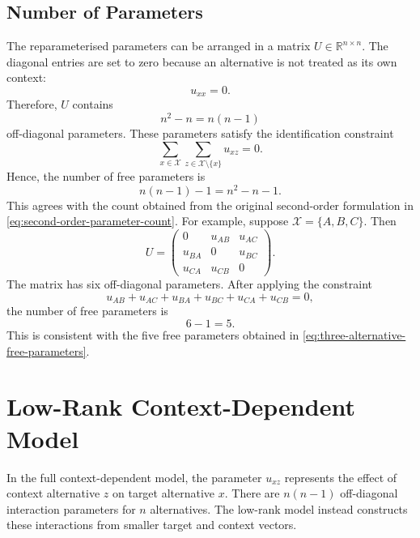 \documentclass[12pt,oneside]{report}
\newcommand{\R}{\mathbb{R}}
\newcommand{\X}{\mathcal{X}}
\begin{document}
\subsection{Number of Parameters}
The reparameterised parameters can be arranged in a matrix
$U\in\R^{n\times n}$. The diagonal entries are set to zero because an
alternative is not treated as its own context:
\begin{equation}
    u_{xx}=0.
\end{equation}
Therefore, $U$ contains
\begin{equation}
    n^2-n=n(n-1)
\end{equation}
off-diagonal parameters. These parameters satisfy the identification
constraint
\begin{equation}
    \sum_{x\in\X}
    \sum_{z\in\X\setminus\{x\}}u_{xz}=0.
    \label{eq:cdm-identification-constraint}
\end{equation}
Hence, the number of free parameters is
\begin{equation}
    n(n-1)-1=n^2-n-1.
\end{equation}
This agrees with the count obtained from the original second-order
formulation in \cref{eq:second-order-parameter-count}.
For example, suppose $\X=\{A,B,C\}$. Then
\begin{equation}
    U=
    \begin{pmatrix}
        0      & u_{AB} & u_{AC}\\
        u_{BA} & 0      & u_{BC}\\
        u_{CA} & u_{CB} & 0
    \end{pmatrix}.
\end{equation}
The matrix has six off-diagonal parameters. After applying the constraint
\begin{equation}
    u_{AB}+u_{AC}+u_{BA}+u_{BC}+u_{CA}+u_{CB}=0,
\end{equation}
the number of free parameters is
\begin{equation}
    6-1=5.
\end{equation}
This is consistent with the five free parameters obtained in
\cref{eq:three-alternative-free-parameters}.


\section{Low-Rank Context-Dependent Model}
\label{sec:low-rank-cdm}

In the full context-dependent model, the parameter $u_{xz}$
represents the effect of context alternative $z$ on target
alternative $x$. There are $n(n-1)$ off-diagonal interaction
parameters for $n$ alternatives. The low-rank model instead
constructs these interactions from smaller target and context
vectors.
\end{document}
